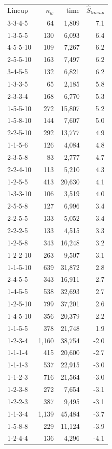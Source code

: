 \begin{tabular}{lrrr}
Lineup & $n_w$ & time & $\hat{S}_{lineup}$ \\
3-3-4-5 & 64 & 1,809 & 7.1 \\
1-3-5-5 & 130 & 6,093 & 6.4 \\
4-5-5-10 & 109 & 7,267 & 6.2 \\
2-5-5-10 & 163 & 7,497 & 6.2 \\
3-4-5-5 & 132 & 6,821 & 6.2 \\
1-3-3-5 & 65 & 2,185 & 5.8 \\
2-3-3-4 & 168 & 6,770 & 5.3 \\
1-5-5-10 & 272 & 15,807 & 5.2 \\
1-5-8-10 & 144 & 7,607 & 5.0 \\
2-2-5-10 & 292 & 13,777 & 4.9 \\
1-1-5-6 & 126 & 4,084 & 4.8 \\
2-3-5-8 & 83 & 2,777 & 4.7 \\
2-2-4-10 & 113 & 5,210 & 4.3 \\
1-2-5-5 & 413 & 20,630 & 4.1 \\
1-3-3-10 & 106 & 3,519 & 4.0 \\
2-5-5-8 & 127 & 6,996 & 3.4 \\
2-2-5-5 & 133 & 5,052 & 3.4 \\
2-2-2-5 & 133 & 4,515 & 3.3 \\
1-2-5-8 & 343 & 16,248 & 3.2 \\
1-2-2-10 & 263 & 9,507 & 3.1 \\
1-1-5-10 & 639 & 31,872 & 2.8 \\
2-4-5-5 & 343 & 16,911 & 2.7 \\
1-4-5-5 & 538 & 32,693 & 2.7 \\
1-2-5-10 & 799 & 37,201 & 2.6 \\
1-4-5-10 & 356 & 20,379 & 2.2 \\
1-1-5-5 & 378 & 21,748 & 1.9 \\
1-2-3-4 & 1,160 & 38,754 & -2.0 \\
1-1-1-4 & 415 & 20,600 & -2.7 \\
1-1-1-3 & 537 & 22,915 & -3.0 \\
1-1-2-3 & 716 & 21,564 & -3.0 \\
1-2-3-8 & 272 & 7,654 & -3.1 \\
1-2-2-3 & 387 & 9,495 & -3.1 \\
1-1-3-4 & 1,139 & 45,484 & -3.7 \\
1-5-8-8 & 229 & 11,124 & -3.9 \\
1-2-4-4 & 136 & 4,296 & -4.1 \\

\end{tabular}

